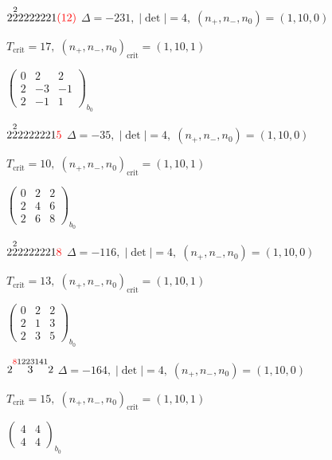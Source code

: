 \documentclass[10pt]{article}
\begin{document}
$2\overset{2}{2}2222221\textcolor{red}{(12)}$ \quad $\Delta=-231,\; |\det|=4,\; (n_+,n_-,n_0)=(1,10,0)$

\hspace{1em}$T_{\text{crit}}=17,\; (n_+,n_-,n_0)_{\text{crit}}=(1,10,1)$

\hspace{2em}$\left(\begin{smallmatrix}0 & 2 & 2 \\ 2 & -3 & -1 \\ 2 & -1 & 1\end{smallmatrix}\right)_{\!b_0}$

$2\overset{2}{2}2222221\textcolor{red}{5}$ \quad $\Delta=-35,\; |\det|=4,\; (n_+,n_-,n_0)=(1,10,0)$

\hspace{1em}$T_{\text{crit}}=10,\; (n_+,n_-,n_0)_{\text{crit}}=(1,10,1)$

\hspace{2em}$\left(\begin{smallmatrix}0 & 2 & 2 \\ 2 & 4 & 6 \\ 2 & 6 & 8\end{smallmatrix}\right)_{\!b_0}$

$2\overset{2}{2}2222221\textcolor{red}{8}$ \quad $\Delta=-116,\; |\det|=4,\; (n_+,n_-,n_0)=(1,10,0)$

\hspace{1em}$T_{\text{crit}}=13,\; (n_+,n_-,n_0)_{\text{crit}}=(1,10,1)$

\hspace{2em}$\left(\begin{smallmatrix}0 & 2 & 2 \\ 2 & 1 & 3 \\ 2 & 3 & 5\end{smallmatrix}\right)_{\!b_0}$

\smallskip

$2\overset{\textcolor{red}{8}1223141}{3}2$ \quad $\Delta=-164,\; |\det|=4,\; (n_+,n_-,n_0)=(1,10,0)$

\hspace{1em}$T_{\text{crit}}=15,\; (n_+,n_-,n_0)_{\text{crit}}=(1,10,1)$

\hspace{2em}$\left(\begin{smallmatrix}4 & 4 \\ 4 & 4\end{smallmatrix}\right)_{\!b_0}$
\end{document}

